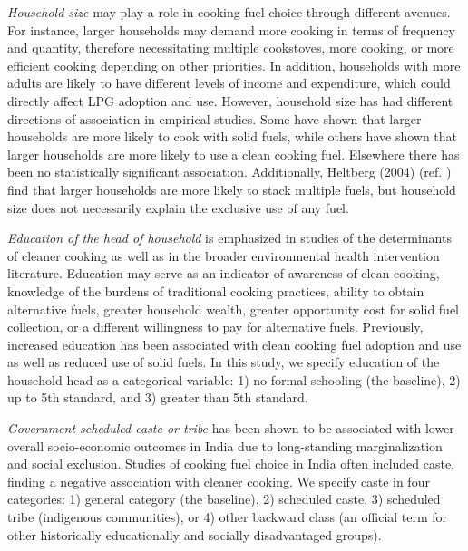 \documentclass[11pt,english]{article}
\theoremstyle{plain} \newtheorem{claim}{Claim}
\theoremstyle{plain} \newtheorem{prop}{Proposition}
\theoremstyle{plain} \newtheorem{hypo}{Hypothesis}
\begin{document}
\textit{Household size} may play a role in cooking fuel choice through different avenues. For instance, larger households may demand more cooking in terms of frequency and quantity, therefore necessitating multiple cookstoves, more cooking, or more efficient cooking depending on other priorities. In addition, households with more adults are likely to have different levels of income and expenditure, which could directly affect LPG adoption and use. However, household size has had different directions of association in empirical studies. Some have shown that larger households are more likely to cook with solid fuels\citep{RaoReddy2007,PandeyChaubal2011}, while others have shown that larger households are more likely to use a clean cooking fuel\citep{GuptaKohlin2006,BaiyegunhiHassan2014}. Elsewhere there has been no statistically significant association\citep{Chenetal2006}. Additionally, Heltberg (2004) (ref. \cite{Heltberg2004}) find that larger households are more likely to stack multiple fuels, but household size does not necessarily explain the exclusive use of any fuel. 

\textit{Education of the head of household} is emphasized in studies of the determinants of cleaner cooking\citep{MullerYan2018} as well as in the broader environmental health intervention literature\citep{Dreibelbisetal2013}. Education may serve as an indicator of awareness of clean cooking, knowledge of the burdens of traditional cooking practices, ability to obtain alternative fuels, greater household wealth, greater opportunity cost for solid fuel collection, or a different willingness to pay for alternative fuels. Previously, increased education has been associated with clean cooking fuel adoption and use\citep{Dalabaetal2018,Wolfetal2017} as well as reduced use of solid fuels\citep{Abebaw2008}. In this study, we specify education of the household head as a categorical variable: 1) no formal schooling (the baseline), 2) up to 5th standard, and 3) greater than 5th standard. 

\textit{Government-scheduled caste or tribe} has been shown to be associated with lower overall socio-economic outcomes in India due to long-standing marginalization and social exclusion\citep{DesaiDubey2012}. Studies of cooking fuel choice in India often included caste, finding a negative association with cleaner cooking\citep{Menghwanietal2019,SaxenaBhattacharya2018,Kumar2017,LewisPattanayak2012}. We specify caste in four categories: 1) general category (the baseline), 2) scheduled caste, 3) scheduled tribe (indigenous communities), or 4) other backward class (an official term for other historically educationally and socially disadvantaged groups).
\end{document}
